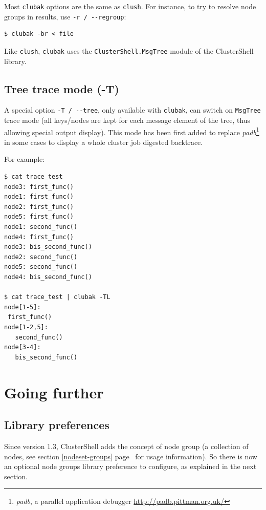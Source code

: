 \documentclass[english,a4paper]{csuserguide}
\newcommand{\clush}{\texttt{clush}\xspace}
\newcommand{\clubak}{\texttt{clubak}\xspace}
\begin{document}
Most \clubak options are the same as \clush. For instance, to try to resolve node groups in results, use \verb+-r / --regroup+:
\medskip
\begin{lstlisting}[breaklines=true, breakatwhitespace=true]
$ clubak -br < file 
\end{lstlisting}

Like \clush, \clubak uses the \verb+ClusterShell.MsgTree+ module of the ClusterShell library.

\subsection{Tree trace mode (-T)}
A special option \verb+-T / --tree+, only available with \clubak, can switch on \verb+MsgTree+ trace mode (all keys/nodes are kept for each message element of the tree, thus allowing special output display). This mode has been first added to replace \textit{padb}\footnote{\textit{padb}, a parallel application debugger \url{http://padb.pittman.org.uk/}} in some cases to display a whole cluster job digested backtrace.

For example:
\medskip
\begin{lstlisting}[breaklines=true, breakatwhitespace=true]
$ cat trace_test
node3: first_func()
node1: first_func()
node2: first_func()
node5: first_func()
node1: second_func()
node4: first_func()
node3: bis_second_func()
node2: second_func()
node5: second_func()
node4: bis_second_func()

$ cat trace_test | clubak -TL
node[1-5]:
 first_func()
node[1-2,5]:
   second_func()
node[3-4]:
   bis_second_func()
\end{lstlisting}



\newpage



\section{Going further}

\subsection{Library preferences}

Since version 1.3, ClusterShell adds the concept of node group (a collection of nodes, see section \ref{nodeset-groups} page~\pageref{nodeset-groups} for usage information). So there is now an optional node groups library preference to configure, as explained in the next section.
\end{document}
